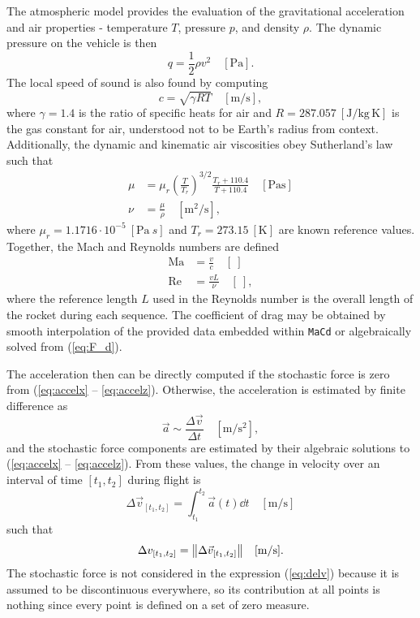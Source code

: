 \documentclass[11pt]{thesis}
\numberwithin{equation}{section}
\begin{document}
The atmospheric model provides the evaluation of the gravitational acceleration and air properties - temperature $T$, pressure $p$, and density $\rho$. The dynamic pressure on the vehicle is then
\begin{equation}
q = \frac{1}{2}\rho v^2 \quad [\si{\Pa}].
\end{equation}
The local speed of sound is also found by computing
\begin{equation}
c = \sqrt{\gamma R T} \quad [\si{\m/\s}],
\end{equation}
where $\gamma = 1.4$ is the ratio of specific heats for air and $R = 287.057 \ [\si{\J/\kg\,\K}]$ is the gas constant for air, understood not to be Earth's radius from context. Additionally, the dynamic and kinematic air viscosities obey Sutherland's law such that
\begin{align}
\mu &= \mu_r \left(\frac{T}{T_r}\right)^{\!3/2} \frac{T_r + 110.4}{T + 110.4} \quad [\si{\Pa \s}] \\
\nu &= \frac{\mu}{\rho} \quad [\si{\m^2/\s}],
\end{align}
where $\mu_r = 1.1716 \cdot 10^{-5} \ [\si{\Pa \ s}]$ and $T_r = 273.15 \ [\si{\K}]$ are known reference values. Together, the Mach and Reynolds numbers are defined
\begin{align}
\mathrm{Ma} &= \frac{v}{c} \quad [\ ] \\
\mathrm{Re} &= \frac{v L}{\nu} \quad [\ ],
\end{align}
where the reference length $L$ used in the Reynolds number is the overall length of the rocket during each sequence. The coefficient of drag may be obtained by smooth interpolation of the provided data embedded within \texttt{MaCd} or algebraically solved from (\ref{eq:F_d}).

The acceleration then can be directly computed if the stochastic force is zero from (\ref{eq:accelx} -- \ref{eq:accelz}). Otherwise, the acceleration is estimated by finite difference as
\begin{equation}
\vec{a} \sim \frac{\Delta \vec{v}}{\Delta t} \quad [\si{\m/\s\squared}],
\end{equation}
and the stochastic force components are estimated by their algebraic solutions to (\ref{eq:accelx} -- \ref{eq:accelz}). From these values, the change in velocity over an interval of time $[t_1, t_2]$ during flight is 
\begin{equation}
\Delta \vec{v}_{[t_1, t_2]} = \int_{t_1}^{t_2} \vec{a}(t) \dd{t} \quad [\si{\m/\s}] \label{eq:delv}
\end{equation}
such that
\begin{equation}
\Delta v_{[t_1, t_2]} = \norm{\Delta \vec{v}_{[t_1, t_2]}} \quad [\si{\m/\s}].
\end{equation}
The stochastic force is not considered in the expression (\ref{eq:delv}) because it is assumed to be discontinuous everywhere, so its contribution at all points is nothing since every point is defined on a set of zero measure.
\end{document}
